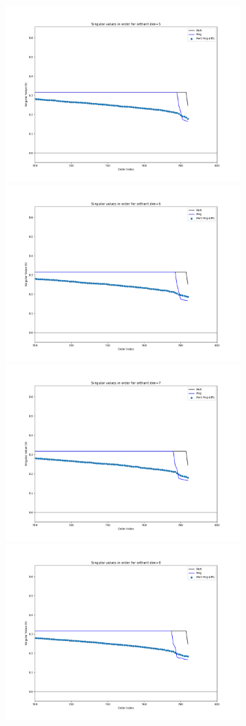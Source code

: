 \includegraphics[width=9cm]{c4_figures/e03-SVD-Orthant_origin-dim-cropped5.png}
\includegraphics[width=9cm]{c4_figures/e03-SVD-Orthant_origin-dim-cropped6.png}
\includegraphics[width=9cm]{c4_figures/e03-SVD-Orthant_origin-dim-cropped7.png}
\includegraphics[width=9cm]{c4_figures/e03-SVD-Orthant_origin-dim-cropped8.png}
